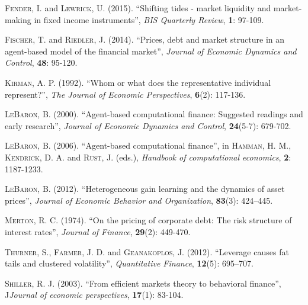 \documentclass[11pt]{article}
\begin{document}
\begin{thebibliography}{100}{}
	 \textsc{Fender, I.} and \textsc{Lewrick, U.} (2015). ``Shifting tides - market liquidity and market-making in fixed income instruments'', \emph{BIS Quarterly Review}, \textbf{1}: 97-109.

	 \textsc{Fischer, T.} and \textsc{Riedler, J.} (2014). ``Prices, debt and market structure in an agent-based model of the financial market'', \emph{Journal of Economic Dynamics and Control}, \textbf{48}: 95-120.
	
	 \textsc{Kirman, A. P.} (1992). ``Whom or what does the representative individual represent?'', \emph{The Journal of Economic Perspectives}, \textbf{6}(2): 117-136.

	 \textsc{LeBaron, B.} (2000). ``Agent-based computational finance: Suggested readings and early research'', \emph{Journal of Economic Dynamics and Control}, \textbf{24}(5-7): 679-702.

	 \textsc{LeBaron, B.} (2006). ``Agent-based computational finance'', in \textsc{Hamman, H. M.}, \textsc{Kendrick, D. A.} and \textsc{Rust, J.} (eds.), \emph{Handbook of computational economics}, \textbf{2}: 1187-1233.

	 \textsc{LeBaron, B.} (2012). ``Heterogeneous gain learning and the dynamics of asset prices'', \emph{Journal of Economic Behavior and Organization}, \textbf{83}(3): 424–445.

	 \textsc{Merton, R. C.} (1974). ``On the pricing of corporate debt: The risk structure of interest rates'', \emph{Journal of Finance}, \textbf{29}(2): 449-470.

	 \textsc{Thurner, S.}, \textsc{Farmer, J. D.} and \textsc{Geanakoplos, J.} (2012). ``Leverage causes fat tails and clustered volatility'', \emph{Quantitative Finance}, \textbf{12}(5): 695–707.

	 \textsc{Shiller, R. J.} (2003). ``From efficient markets theory to behavioral finance'', J\emph{Journal of economic perspectives}, \textbf{17}(1): 83-104.

\end{thebibliography}
\end{document}
